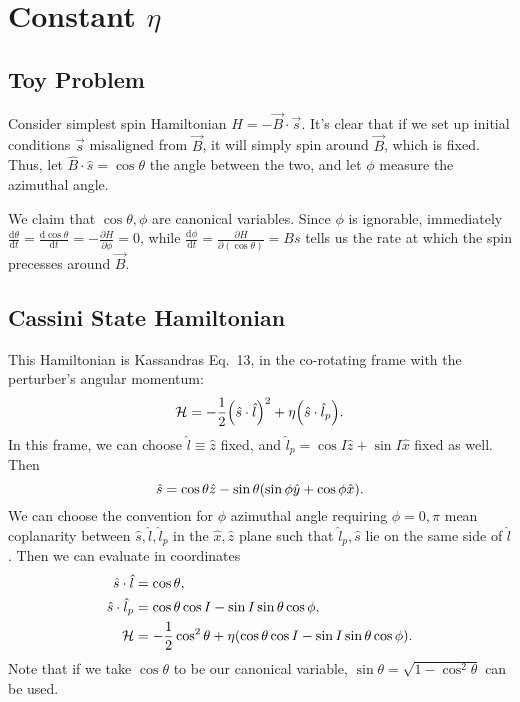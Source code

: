 \documentclass[11pt,
        usenames, %
        dvipsnames %
    ]{article}
\newcommand*{\rd}[2]{\frac{\mathrm{d}#1}{\mathrm{d}#2}}
\newcommand*{\pd}[2]{\frac{\partial#1}{\partial#2}}
\DeclarePairedDelimiter\p{\lparen}{\rparen}
\begin{document}
\def\Snospace~{\S{}} %
\renewcommand*{\sectionautorefname}{\Snospace}
\renewcommand*{\appendixautorefname}{\Snospace}
\renewcommand*{\figureautorefname}{Fig.}
\renewcommand*{\equationautorefname}{Eq.}
\renewcommand*{\tableautorefname}{Tab.}

\section{Constant $\eta$}

\subsection{Toy Problem}

Consider simplest spin Hamiltonian $H = -\vec{B} \cdot \vec{s}$. It's clear that
if we set up initial conditions $\vec{s}$ misaligned from $\vec{B}$, it will
simply spin around $\vec{B}$, which is fixed. Thus, let $\hat{B} \cdot \hat{s} =
\cos \theta$ the angle between the two, and let $\phi$ measure the azimuthal
angle.

We claim that $\cos \theta, \phi$ are canonical variables. Since $\phi$ is
ignorable, immediately $\rd{\theta}{t} = \rd{\cos \theta}{t} = -\pd{H}{\phi} =
0$, while $\rd{\phi}{t} = \pd{H}{(\cos \theta)} = Bs$ tells us the rate at which
the spin precesses around $\vec{B}$.

\subsection{Cassini State Hamiltonian}

This Hamiltonian is Kassandras Eq.\ 13, in the co-rotating frame with the
perturber's angular momentum:
\begin{equation}
    \mathcal{H} = -\frac{1}{2}\p*{\hat{s} \cdot \hat{l}}^2
        + \eta \p*{\hat{s} \cdot \hat{l}_p}.
\end{equation}
In this frame, we can choose $\hat{l} \equiv \hat{z}$ fixed, and $\hat{l}_p =
\cos I\hat{z} + \sin I\hat{x}$ fixed as well. Then
\begin{equation*}
    \hat{s} = \cos\theta \hat{z}
        - \sin\theta\p*{\sin \phi \hat{y} + \cos \phi \hat{x}}.
\end{equation*}
We can choose the convention for $\phi$ azimuthal angle requiring $\phi =
0, \pi$ mean coplanarity between $\hat{s}, \hat{l}, \hat{l}_p$ in the $\hat{x},
\hat{z}$ plane such that $\hat{l}_p, \hat{s}$ lie on the same side of
$\hat{l}$. Then we can evaluate in coordinates
\begin{align*}
    \hat{s} \cdot \hat{l} &= \cos \theta,\\
    \hat{s} \cdot \hat{l}_p
        &= \cos \theta \cos I - \sin I \sin \theta \cos \phi,\\
    \mathcal{H} &= -\frac{1}{2}\cos^2\theta
        + \eta \p*{\cos \theta \cos I - \sin I \sin \theta \cos \phi}.
\end{align*}
Note that if we take $\cos\theta$ to be our canonical variable, $\sin\theta =
\sqrt{1 - \cos^2\theta}$ can be used.
\end{document}
